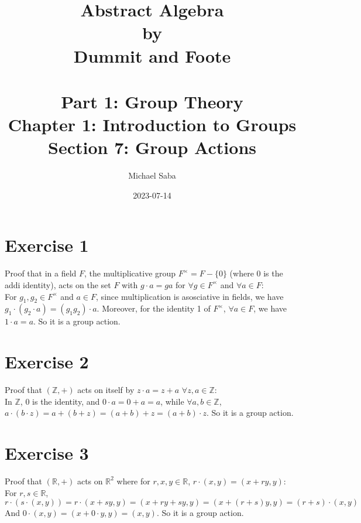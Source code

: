 \documentclass{article}
\title{%
    \Huge Abstract Algebra \\
    \large by \\
    \Large Dummit and Foote \\~\\
    \huge Part 1: Group Theory \\
    \LARGE Chapter 1: Introduction to Groups \\
    \Large Section 7: Group Actions
}
\date{2023-07-14}
\author{Michael Saba}
\newcommand{\Z}{\mathbb{Z}}
\newcommand{\R}{\mathbb{R}}
\begin{document}
    \maketitle
    \newpage


    \section*{Exercise 1}
    Proof that in a field $F$, the multiplicative group
    $F^\times = F - \{0\}$ (where 0 is the addi identity),
    acts on the set $F$ with $g \cdot a = ga$ for $\forall g \in F^\times$
    and $\forall a \in F$: \\
    For $g_1, g_2 \in F^\times$ and $a \in F$,
    since multiplication is asosciative in fields,
    we have $g_1 \cdot (g_2 \cdot a) = (g_1g_2) \cdot a$.
    Moreover, for the identity 1 of $F^\times$,
    $\forall a \in F$, we have $1 \cdot a = a$.
    So it is a group action.


    \section*{Exercise 2}
    Proof that $(\Z, +)$ acts on itself by $z \cdot a = z + a$
    $\forall z, a \in \Z$: \\
    In $\Z$, 0 is the identity, and $0 \cdot a = 0 + a = a$,
    while $\forall a, b \in \Z$,
    $a \cdot (b \cdot z) = a + (b + z) = (a + b) + z = (a + b) \cdot z$.
    So it is a group action.


    \section*{Exercise 3}
    Proof that $(\R, +)$ acts on $\R^2$
    where for $r, x, y \in \R$, $r \cdot (x, y) = (x + ry, y)$: \\
    For $r, s \in \R$,
    $r \cdot (s \cdot (x, y)) = r \cdot (x + sy, y)
    = (x + ry + sy, y)
    = (x + (r + s)y, y)
    = (r + s) \cdot (x, y)$
    And $0 \cdot (x, y) = (x + 0 \cdot y, y) = (x, y)$.
    So it is a group action.
\end{document}
